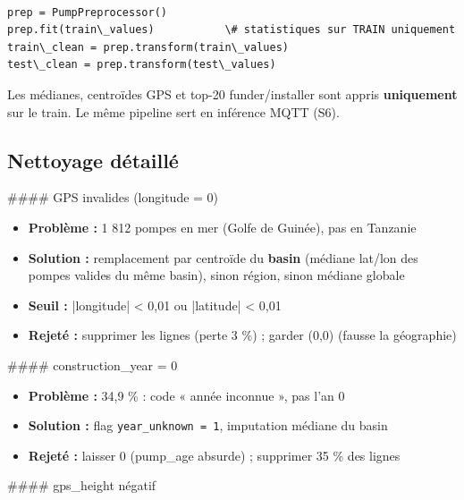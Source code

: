 \documentclass[11pt,a4paper]{report}
\begin{document}
\begin{lstlisting}

prep = PumpPreprocessor()
prep.fit(train\_values)           \# statistiques sur TRAIN uniquement
train\_clean = prep.transform(train\_values)
test\_clean = prep.transform(test\_values)

\end{lstlisting}

Les médianes, centroïdes GPS et top-20 funder/installer sont appris \textbf{uniquement} sur le train. Le même pipeline sert en inférence MQTT (S6).

\subsection{Nettoyage détaillé}

\#\#\#\# GPS invalides (longitude = 0)

\begin{itemize}

\item \textbf{Problème :} 1 812 pompes en mer (Golfe de Guinée), pas en Tanzanie

\item \textbf{Solution :} remplacement par centroïde du \textbf{basin} (médiane lat/lon des pompes valides du même basin), sinon région, sinon médiane globale

\item \textbf{Seuil :} |longitude| < 0,01 ou |latitude| < 0,01

\item \textbf{Rejeté :} supprimer les lignes (perte 3 \%) ; garder (0,0) (fausse la géographie)

\end{itemize}

\#\#\#\# construction\_year = 0

\begin{itemize}

\item \textbf{Problème :} 34,9 \% : code « année inconnue », pas l'an 0

\item \textbf{Solution :} flag \texttt{year\_unknown = 1}, imputation médiane du basin

\item \textbf{Rejeté :} laisser 0 (pump\_age absurde) ; supprimer 35 \% des lignes

\end{itemize}

\#\#\#\# gps\_height négatif
\end{document}
